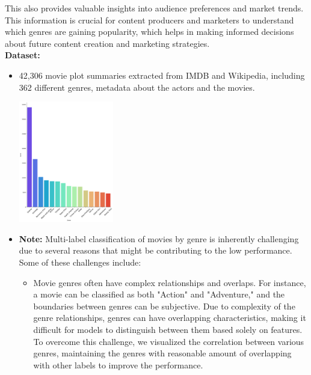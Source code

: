 \documentclass[hbrs-poster.tex]{subfiles}
\begin{document}
{        This also provides valuable insights into audience preferences and market trends. This information is crucial for content producers and marketers to understand which genres are gaining popularity, which helps in making informed decisions about future content creation and marketing strategies.\\
        \textbf{Dataset:}
        \begin{itemize}
            \item 42,306 movie plot summaries extracted from IMDB and Wikipedia,
            including 362 different genres, metadata about the actors and the movies. 
            \begin{tikzfigure}
                \includegraphics[width=0.325\textwidth, height=0.13\textheight]{figures/output.png}
            \end{tikzfigure}
            \item \textbf{Note:} Multi-label classification of movies by genre is inherently challenging due to several reasons that might be contributing to the low performance. Some of these challenges include:
            \begin{itemize}
                \item Movie genres often have complex relationships and overlaps. For instance, a movie can be classified as both "Action" and "Adventure," and the boundaries between genres can be subjective. Due to complexity of the genre relationships, genres can have overlapping characteristics, making it difficult for models to distinguish between them based solely on features. To overcome this challenge, we visualized the correlation between various genres, maintaining the genres with reasonable amount of overlapping with other labels to improve the performance.

\end{itemize}
\end{itemize}}
\end{document}
